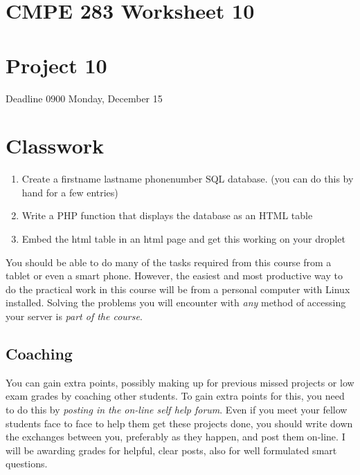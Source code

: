 \documentclass[12pt, a4paper]{article}
\begin{document}

\section*{CMPE 283 Worksheet 10}
\section*{Project 10} 
Deadline 0900 Monday, December 15


\section*{Classwork}



\begin{enumerate}
 \item Create a firstname lastname phonenumber SQL database. (you can do this by hand for a few entries)
 \item Write a PHP function that displays the database as an HTML table
 \item Embed the html table in an html page and get this working on your droplet
\end{enumerate}

You should be able to do many of the tasks required from this course from a tablet or even a smart phone. However, the easiest and most productive way to do the practical work in this course will be from a personal computer with Linux installed. Solving the problems you will encounter with \emph{any} method of accessing your server is \emph{part of the course}.

\subsection*{Coaching}

You can gain extra points, possibly making up for previous missed projects or low exam grades by coaching other students. To gain extra points for this, you need to do this by \emph{posting in the on-line self help forum}. Even if you meet your fellow students face to face to help them get these projects done, you should write down the exchanges between you, preferably as they happen, and post them on-line. I will be awarding grades for helpful, clear posts, also for well formulated smart questions. 
\end{document}

